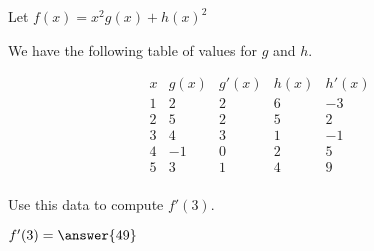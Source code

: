 \documentclass{ximera}
\author{Steven Gubkin}
\begin{document}
\begin{exercise}

Let $f(x) = x^2 g(x)+h(x)^2$

We have the following table of values for $g$ and $h$.

\[
\begin{array}{c|c|c|c|c}
 x & g(x) & g'(x) & h(x) & h'(x)\\ \hline
 1 & 2 & 2 & 6 & -3\\ 
 2 & 5 & 2 & 5 & 2\\
 3 & 4 & 3 & 1 & -1\\ 
 4 & -1 & 0 & 2 & 5\\ 
 5 & 3 & 1 & 4 & 9\\ 
\end{array}
\]

Use this data to compute $f'(3)$.

\begin{prompt}
	$f'(3) = \answer{49}$
\end{prompt}

\end{exercise}
\end{document}

